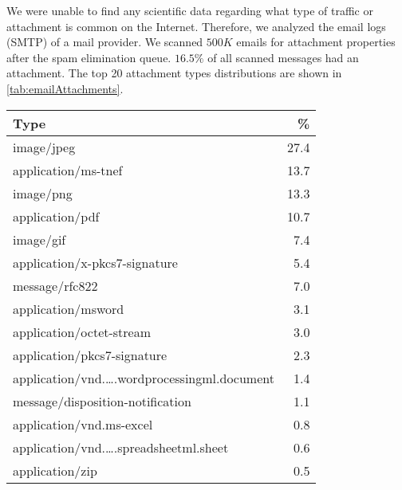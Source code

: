 We were unable to find any scientific data regarding what type of traffic or attachment is common on the Internet. Therefore, we analyzed the email logs (SMTP) of a mail provider. We scanned $500K$ emails for attachment properties after the spam elimination queue. $16.5\%$ of all scanned messages had an attachment. The top 20 attachment types distributions are shown in \cref{tab:emailAttachments}.
\begin{table}[ht]
	
	\begin{tabular}{l|r}\hline
		Type                                                                        & \%\\\hline
		image/jpeg                                                                  &    27.4\\
		application/ms-tnef                                                         &    13.7\\
		image/png                                                                   &    13.3\\
		application/pdf                                                             &    10.7\\
		image/gif                                                                   &    7.4\\
		application/x-pkcs7-signature                                               &    5.4\\
		message/rfc822                                                              &    7.0\\
		application/msword                                                          &    3.1\\
		application/octet-stream                                                    &    3.0\\
		application/pkcs7-signature                                                 &    2.3\\
		application/vnd.\ldots.wordprocessingml.document                            &    1.4\\
		message/disposition-notification                                            &    1.1\\
		application/vnd.ms-excel                                                    &    0.8\\
		application/vnd.\ldots.spreadsheetml.sheet                                  &    0.6\\
		application/zip                                                             &    0.5\\

\end{tabular}
\end{table}
